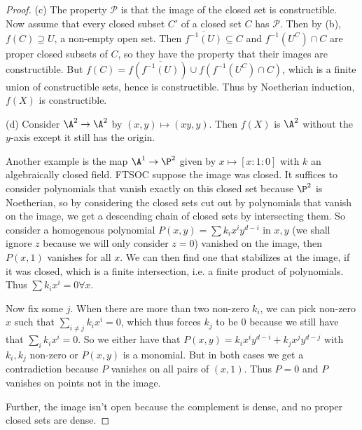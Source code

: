 \begin{proof}
	(c) The property $\mathscr{P} $ is that the image of the closed set is constructible.
	Now assume that every closed subset $C' $ of a closed set $C $ has $\mathscr{P} $.
	Then by (b), $f(C) \supseteq U $, a non-empty open set.
	Then $\overline{f^{-1}(U)} \subseteq C$ and $f^{-1}(U^C)\cap C $ are proper closed subsets of $C $, so they have the property that their images are constructible.
	But $f(C) = f(\overline{f^{-1}(U)}) \cup f(f^{-1}(U^C)\cap C)$, which is a finite union of constructible sets, hence is constructible.
	Thus by Noetherian induction, $f(X) $ is constructible.

	(d) Consider $\A^2 \to \A^2$ by $(x,y) \mapsto (xy,y) $.
	Then $f(X) $ is $\A^2 $ without the $y $-axis except it still has the origin.

	Another example is the map $\A^1 \to \P^2 $ given by $x\mapsto [x:1:0] $ with $k $ an algebraically closed field.
	FTSOC suppose the image was closed.
	It suffices to consider polynomials that vanish exactly on this closed set because $\P^2 $ is Noetherian, so by considering the closed sets cut out by polynomials that vanish on the image, we get a descending chain of closed sets by intersecting them.
	So consider a homogenous polynomial $P(x,y) = \sum k_{i} x^{i}y^{d-i}   $ in $x,y$ (we shall ignore $z $ because we will only consider $z=0 $) vanished on the image, then $P(x,1) $ vanishes for all $x $.
	We can then find one that stabilizes at the image, if it was closed, which is a finite intersection, i.e. a finite product of polynomials.
	Thus $\sum k_i x^i = 0 \forall x $.

	Now fix some $j $.
	When there are more than two non-zero $k_i $, we can pick non-zero $x $ such that $\sum_{i\ne j} k_i x^i = 0$, which thus forces $k_j $ to be $0 $ because we still have that $\sum_i k_i x^i = 0 $.
	So we either have that $P(x,y) = k_i x^iy^{d-i} + k_j x^{j}y^{d-j}$ with $k_i,k_j $ non-zero or $P(x,y) $ is a monomial.
	But in both cases we get a contradiction because $P $ vanishes on all pairs of $(x,1) $.
	Thus $P=0 $ and $P $ vanishes on points not in the image.

	Further, the image isn't open because the complement is dense, and no proper closed sets are dense.
\end{proof}


